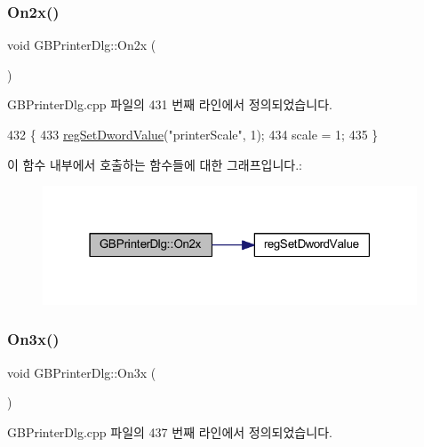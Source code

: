 \subsubsection{\texorpdfstring{On2x()}{On2x()}}
{\footnotesize\ttfamily void G\+B\+Printer\+Dlg\+::\+On2x (\begin{DoxyParamCaption}{ }\end{DoxyParamCaption})\hspace{0.3cm}{\ttfamily [protected]}}



G\+B\+Printer\+Dlg.\+cpp 파일의 431 번째 라인에서 정의되었습니다.


\begin{DoxyCode}
432 \{
433   \mbox{\hyperlink{_reg_8cpp_a758e775489a3fb5c3cc7071fdd5af87e}{regSetDwordValue}}(\textcolor{stringliteral}{"printerScale"}, 1);
434   scale = 1;
435 \}
\end{DoxyCode}
이 함수 내부에서 호출하는 함수들에 대한 그래프입니다.\+:
\nopagebreak
\begin{figure}[H]
\begin{center}
\leavevmode
\includegraphics[width=316pt]{class_g_b_printer_dlg_a9b887ad630794874e2b39c3558bf5d33_cgraph}
\end{center}
\end{figure}
\mbox{\label{class_g_b_printer_dlg_ac3863f81d31a5d37a0369dab6bfbf87e}} 
\subsubsection{\texorpdfstring{On3x()}{On3x()}}
{\footnotesize\ttfamily void G\+B\+Printer\+Dlg\+::\+On3x (\begin{DoxyParamCaption}{ }\end{DoxyParamCaption})\hspace{0.3cm}{\ttfamily [protected]}}



G\+B\+Printer\+Dlg.\+cpp 파일의 437 번째 라인에서 정의되었습니다.


